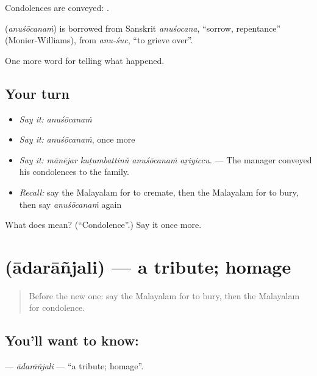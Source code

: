 Condolences are conveyed:  .

\begin{cousinweb}
\textbf{} (\emph{anuśōcanaṁ}) is borrowed from Sanskrit \emph{anuśocana}, \textquotedblleft{}sorrow, repentance\textquotedblright{} (Monier-Williams), from \emph{anu-śuc}, \textquotedblleft{}to grieve over\textquotedblright{}.
\end{cousinweb}

\begin{grammarlens}[title={What you've built}]
One more word for telling what happened.
\end{grammarlens}

\subsection*{Your turn}
\begin{itemize}
\raggedright
  \item \emph{Say it:} \emph{anuśōcanaṁ}
  \item \emph{Say it:} \emph{anuśōcanaṁ}, once more
  \item \emph{Say it:} \emph{mānējar kuṭumbattinŭ anuśōcanaṁ aṟiyiccu.} — The manager conveyed his condolences to the family.
  \item \emph{Recall:} say the Malayalam for to cremate, then the Malayalam for to bury, then say \emph{anuśōcanaṁ} again
\end{itemize}

\begin{tcolorbox}[breakable,colback=teal!4,colframe=teal!35!black,title={Before you move on}]
What does  mean? (\textquotedblleft{}Condolence\textquotedblright{}.) Say it once more.
\end{tcolorbox}
\section[\texorpdfstring{\ml{ആദരാഞ്ജലി} (ādarāñjali)}{ആദരാഞ്ജലി (ādarāñjali)}]{ (ādarāñjali) — a tribute; homage}

\label{lesson:ML-C392-adaranjali}



\begin{quote}
Before the new one: say the Malayalam for to bury, then the Malayalam for condolence.
\end{quote}

\subsection*{You'll want to know: }
\textbf{} — \emph{ādarāñjali} — \textquotedblleft{}a tribute; homage\textquotedblright{}.

